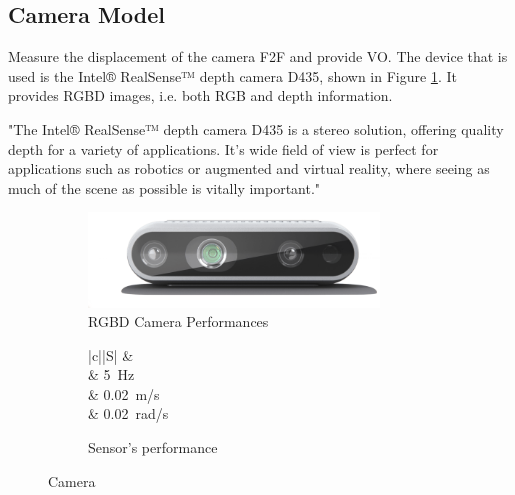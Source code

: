 \subsection{Camera Model}


\noindent Measure the displacement of the camera \gls{F2F} and provide \gls{VO}.
The device that is used is the Intel® RealSense™ depth camera D435, shown in Figure \ref{fig:d435}.
It provides \gls{RGBD} images, i.e. both \gls{RGB} and depth information.

"The Intel® RealSense™ depth camera D435 is a stereo solution, offering quality depth for a variety of applications. It's wide field of view is perfect for applications such as robotics or augmented and virtual reality, where seeing as much of the scene as possible is vitally important."

\begin{figure}[!ht]
	\begin{center}
		\begin{subfigure}[b]{.5\textwidth}
			\begin{center}
				\includegraphics[width=0.85\textwidth]{Images/4-Methods/d435i-1.png}
			\end{center}
			\caption{\gls{RGBD} Camera Performances}
			\label{fig:d435}
		\end{subfigure}
		\begin{subfigure}[b]{.45\textwidth}
			\begin{center}
				\label{tab:evalCamera}
				\begin{tabular}{|c||S|}
					\hline
					 &   \\
					\hline
					\hline
					 &  \SI{5}{Hz} \\
					\hline
					 & \SI{0.02}{\meter/\second} \\
					\hline
					\centering{$\boldsymbol \eta_{\omega}$} & \SI{0.02}{\radian/\second} \\
					\hline
				\end{tabular}
				\caption{Sensor's performance}
			\end{center}
		\end{subfigure}%
		\caption{Camera}
		\label{fig:camera_sensor}
	\end{center}
\end{figure}

